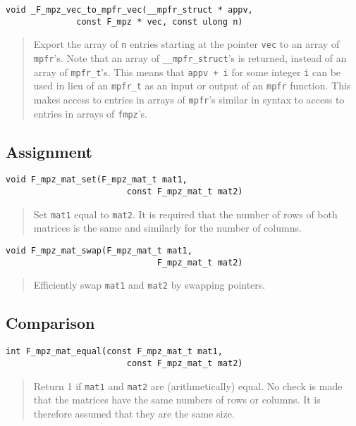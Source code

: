 \documentclass[a4paper,10pt]{article}
\newcommand{\code}{\lstinline}
\begin{document}
\begin{lstlisting}
void _F_mpz_vec_to_mpfr_vec(__mpfr_struct * appv, 
              const F_mpz * vec, const ulong n)
\end{lstlisting}
\begin{quote}
Export the array of \code{n} entries starting at the pointer \code{vec} to an array of \code{mpfr}'s. Note
that an array of \code{__mpfr_struct}'s is returned, instead of an array of \code{mpfr_t}'s. This means
that \code{appv + i} for some integer \code{i} can be used in lieu of an \code{mpfr_t} as an input or output
of an \code{mpfr} function. This makes access to entries in arrays of \code{mpfr}'s similar in syntax to 
access to entries in arrays of \code{fmpz}'s.
\end{quote}

\subsection{Assignment}

\begin{lstlisting}
void F_mpz_mat_set(F_mpz_mat_t mat1, 
                        const F_mpz_mat_t mat2)
\end{lstlisting}
\begin{quote}
Set \code{mat1} equal to \code{mat2}. It is required that the number of rows of both matrices is the same
and similarly for the number of columns.
\end{quote}

\begin{lstlisting}
void F_mpz_mat_swap(F_mpz_mat_t mat1, 
                              F_mpz_mat_t mat2)
\end{lstlisting}
\begin{quote}
Efficiently swap \code{mat1} and \code{mat2} by swapping pointers.
\end{quote}

\subsection{Comparison}

\begin{lstlisting}
int F_mpz_mat_equal(const F_mpz_mat_t mat1, 
                        const F_mpz_mat_t mat2)
\end{lstlisting}
\begin{quote}
Return 1 if \code{mat1} and \code{mat2} are (arithmetically) equal. No check is made that the matrices have
the same numbers of rows or columns. It is therefore assumed that they are the same size.
\end{quote}
\end{document}
